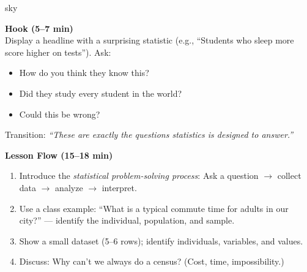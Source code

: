 \documentclass[10pt]{article}
\begin{document}
\begin{skillbox}{sky}
\begin{minipage}[t]{0.48\linewidth}
    \textbf{Hook (5--7 min)}\\
    Display a headline with a surprising statistic (e.g., ``Students who sleep more score higher on tests''). Ask:
    \begin{itemize}
        \item How do you think they know this?
        \item Did they study every student in the world?
        \item Could this be wrong?
    \end{itemize}
    Transition: \textit{``These are exactly the questions statistics is designed to answer.''}
\end{minipage}
\hfill
\begin{minipage}[t]{0.48\linewidth}
    \textbf{Lesson Flow (15--18 min)}
    \begin{enumerate}
        \item Introduce the \textit{statistical problem-solving process}: Ask a question $\to$ collect data $\to$ analyze $\to$ interpret.
        \item Use a class example: ``What is a typical commute time for adults in our city?'' --- identify the individual, population, and sample.
        \item Show a small dataset (5--6 rows); identify individuals, variables, and values.
        \item Discuss: Why can't we always do a census? (Cost, time, impossibility.)
    \end{enumerate}
\end{minipage}
\end{skillbox}
\end{document}

